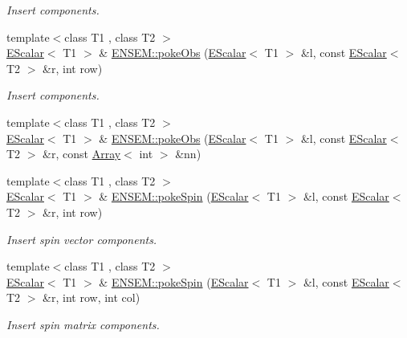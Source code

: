 \begin{DoxyCompactItemize}
\begin{DoxyCompactList}\small\item\em Insert components. \end{DoxyCompactList}\item 
{\footnotesize template$<$class T1 , class T2 $>$ }\\\mbox{\hyperlink{classENSEM_1_1EScalar}{E\+Scalar}}$<$ T1 $>$ \& \mbox{\hyperlink{group__escalar_ga635de79045bc1565a78ea94b9ff967fb}{E\+N\+S\+E\+M\+::poke\+Obs}} (\mbox{\hyperlink{classENSEM_1_1EScalar}{E\+Scalar}}$<$ T1 $>$ \&l, const \mbox{\hyperlink{classENSEM_1_1EScalar}{E\+Scalar}}$<$ T2 $>$ \&r, int row)
\begin{DoxyCompactList}\small\item\em Insert components. \end{DoxyCompactList}\item 
{\footnotesize template$<$class T1 , class T2 $>$ }\\\mbox{\hyperlink{classENSEM_1_1EScalar}{E\+Scalar}}$<$ T1 $>$ \& \mbox{\hyperlink{group__escalar_gad25640d827b75330c6d3f288290866fd}{E\+N\+S\+E\+M\+::poke\+Obs}} (\mbox{\hyperlink{classENSEM_1_1EScalar}{E\+Scalar}}$<$ T1 $>$ \&l, const \mbox{\hyperlink{classENSEM_1_1EScalar}{E\+Scalar}}$<$ T2 $>$ \&r, const \mbox{\hyperlink{classXMLArray_1_1Array}{Array}}$<$ int $>$ \&nn)
\item 
{\footnotesize template$<$class T1 , class T2 $>$ }\\\mbox{\hyperlink{classENSEM_1_1EScalar}{E\+Scalar}}$<$ T1 $>$ \& \mbox{\hyperlink{group__escalar_gae8b2f2d3c5fedfb458392f11d78f2c88}{E\+N\+S\+E\+M\+::poke\+Spin}} (\mbox{\hyperlink{classENSEM_1_1EScalar}{E\+Scalar}}$<$ T1 $>$ \&l, const \mbox{\hyperlink{classENSEM_1_1EScalar}{E\+Scalar}}$<$ T2 $>$ \&r, int row)
\begin{DoxyCompactList}\small\item\em Insert spin vector components. \end{DoxyCompactList}\item 
{\footnotesize template$<$class T1 , class T2 $>$ }\\\mbox{\hyperlink{classENSEM_1_1EScalar}{E\+Scalar}}$<$ T1 $>$ \& \mbox{\hyperlink{group__escalar_ga7f41ec60f3cfb7ed2f965af5b8a81132}{E\+N\+S\+E\+M\+::poke\+Spin}} (\mbox{\hyperlink{classENSEM_1_1EScalar}{E\+Scalar}}$<$ T1 $>$ \&l, const \mbox{\hyperlink{classENSEM_1_1EScalar}{E\+Scalar}}$<$ T2 $>$ \&r, int row, int col)
\begin{DoxyCompactList}\small\item\em Insert spin matrix components. \end{DoxyCompactList}\item 

\end{DoxyCompactItemize}
